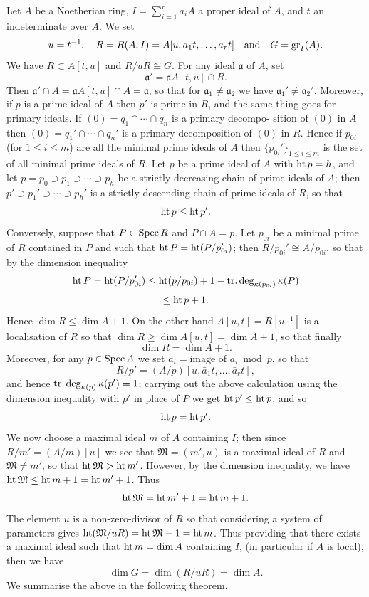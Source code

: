 Let $A$ be a Noetherian ring, $I = \sum_{i=1}^{r} a_iA$ a proper ideal of $A$, and $t$ an
indeterminate over $A$. We set
\[
  u = t^{-1}, \quad R = R(A, I) = A[u, a_1t, \ldots, a_rt] \quad \text{and} \quad G = \operatorname{gr}_I(A).
\]
We have $R \subset A[t, u]$ and $R/uR \cong G$. For any ideal $\mathfrak{a}$ of $A$, set
\[
  \mathfrak{a}' = \mathfrak{a}A[t, u] \cap R.
\]
Then $\mathfrak{a}' \cap A = \mathfrak{a}A[t, u] \cap A = \mathfrak{a}$, so that for $\mathfrak{a}_1 \neq \mathfrak{a}_2$ we have $\mathfrak{a}_1' \neq \mathfrak{a}_2'$.
Moreover, if $p$ is a prime ideal of $A$ then $p'$ is prime in $R$, and the same
thing goes for primary ideals. If $(0) = q_1 \cap \cdots \cap q_n$ is a primary decompo-
sition of $(0)$ in $A$ then $(0) = q_1' \cap \cdots \cap q_n'$ is a primary decomposition of $(0)$
in $R$. Hence if $p_{0i}$ (for $1 \le i \le m$) are all the minimal prime ideals of $A$ then
$\{p_{0i}'\}_{1 \le i \le m}$ is the set of all minimal prime ideals of $R$. Let $p$ be a prime
ideal of $A$ with $\operatorname{ht} p = h$, and let $p = p_0 \supset p_1 \supset \cdots \supset p_h$ be a strictly decreasing
chain of prime ideals of $A$; then $p' \supset p_1' \supset \cdots \supset p_h'$ is a strictly descending
chain of prime ideals of $R$, so that
\[
  \operatorname{ht} p \le \operatorname{ht} p'.
\]
Conversely, suppose that $P \in \operatorname{Spec} R$ and $P \cap A = p$. Let $p_{0i}$ be a minimal
prime of $R$ contained in $P$ and such that $\operatorname{ht} P = \operatorname{ht} (P/p_{0i}')$; then $R/p_{0i}' \cong
A/p_{0i}$, so that by the dimension inequality
\[
  \operatorname{ht} P = \operatorname{ht} (P/p_{0i}') \le \operatorname{ht} (p/p_{0i}) + 1 - \operatorname{tr.deg}_{\kappa(p_{0i})}\kappa(P)
\]
\[
  \le \operatorname{ht} p + 1.
\]
Hence $\dim R \le \dim A + 1$. On the other hand $A[u, t] = R[u^{-1}]$ is a
localisation of $R$ so that $\dim R \ge \dim A[u, t] = \dim A + 1$, so that finally
\[
  \dim R = \dim A + 1.
\]
Moreover, for any $p \in \operatorname{Spec} A$ we set $\bar{a}_i = \text{image of } a_i \bmod p$, so that
\[
  R/p' = (A/p)[u, \bar{a}_1t, \ldots, \bar{a}_rt],
\]
and hence $\operatorname{tr.deg}_{\kappa(p)} \kappa(p') = 1$; carrying out the above
calculation using the dimension inequality with $p'$ in place of $P$ we get
$\operatorname{ht} p' \le \operatorname{ht} p$, and so
\[
  \operatorname{ht} p = \operatorname{ht} p'.
\]
We now choose a maximal ideal $m$ of $A$ containing $I$; then since
$R/m' = (A/m)[u]$ we see that $\mathfrak{M} = (m', u)$ is a maximal ideal of $R$ and
$\mathfrak{M} \neq m'$, so that $\operatorname{ht} \mathfrak{M} > \operatorname{ht} m'$. However, by the dimension inequality, we
have $\operatorname{ht} \mathfrak{M} \le \operatorname{ht} m + 1 = \operatorname{ht} m' + 1$. Thus
\[
  \operatorname{ht} \mathfrak{M} = \operatorname{ht} m' + 1 = \operatorname{ht} m + 1.
\]
The element $u$ is a non-zero-divisor of $R$ so that considering a system of
parameters gives $\operatorname{ht} (\mathfrak{M}/uR) = \operatorname{ht} \mathfrak{M} - 1 = \operatorname{ht} m$. Thus providing that there
exists a maximal ideal such that $\operatorname{ht} m = \dim A$ containing $I$, (in particular
if $A$ is local), then we have
\[
  \dim G = \dim (R/uR) = \dim A.
\]
We summarise the above in the following theorem.


